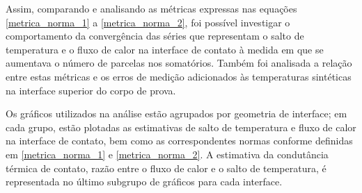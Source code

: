 Assim, comparando e analisando as métricas expressas nas equações \eqref{metrica_norma_1} a \eqref{metrica_norma_2}, foi possível investigar o comportamento da convergência das séries que representam o salto de temperatura e o fluxo de calor na interface de contato à medida em que se aumentava o número de parcelas nos somatórios. Também foi analisada a relação entre estas métricas e os erros de medição adicionados às temperaturas sintéticas na interface superior do corpo de prova.

Os gráficos utilizados na análise estão agrupados por geometria de interface; em cada grupo, estão plotadas as estimativas de salto de temperatura e fluxo de calor na interface de contato, bem como as correspondentes normas conforme definidas em \eqref{metrica_norma_1} e \eqref{metrica_norma_2}. A estimativa da condutância térmica de contato, razão entre o fluxo de calor e o salto de temperatura, é representada no último subgrupo de gráficos para cada interface.

\newcommand{\graficoerrorms}[6]{%
	\begin{minipage}[t][6cm][c]{4.5cm}
		\centering		
		\begin{tikzpicture}[scale=0.75]
		\begin{axis}[
		axis lines=left,
		/pgf/number format/1000 sep={.},/pgf/number format/use comma,
		grid=major,
		legend style={legend pos=north west}
		scaled x ticks = true,
		scaled y ticks = true,
		x tick label style={/pgf/number format/fixed},
		y tick label style={/pgf/number format/fixed},
		xtick = {0,5,10,15,20,25,30,35,40,45,50},
		anchor=east,  
		width=7cm,
		height=6cm,
		label style={font=\footnotesize},
		xlabel = $N_j$,
		ylabel= $\log\left(\delta_{#5}\right)$,
		ylabel style={rotate=-90, at={(-0.1, 1)}, anchor = south west}]
		\pgfplotstableread{../data/#1_#2_interface_0#3_conductance_0#4_stdev_00.dat} 
		\teff
		\addplot[color=blue,mark=o,mark options={mark size=2.0pt}] table from \teff;
		\pgfplotstableread{../data/#1_#2_interface_0#3_conductance_0#4_stdev_01.dat} 
		\teff
		\addplot[color=red,mark=square,mark options={mark size=2.0pt}] table from \teff;
		\pgfplotstableread{../data/#1_#2_interface_0#3_conductance_0#4_stdev_05.dat} 
		\teff
		\addplot[color=gray,mark=triangle,mark options={mark size=2.0pt}] table from \teff;
		\end{axis}
		\end{tikzpicture}
		\caption*{(#6)Perfil #4}
	\end{minipage}
}%

